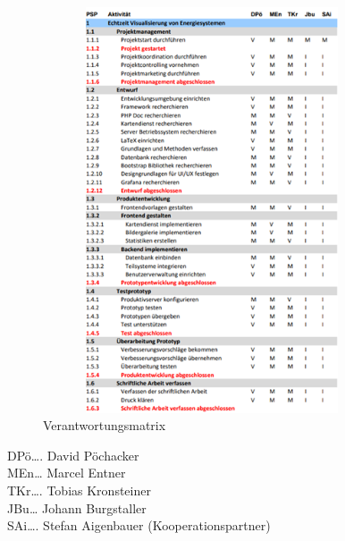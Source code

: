 \begin{figure}[h]
	\centering
	\includegraphics[height=12cm,width=10cm]{images/Verantwortungsmatrix}
	\caption{Verantwortungsmatrix}
	\label{fig:Verantwortungsmatrix }
\end{figure}
 DPö…. David Pöchacker \\
 MEn… Marcel Entner \\
 TKr…. Tobias Kronsteiner \\
 JBu… Johann Burgstaller \\
 SAi…. Stefan Aigenbauer (Kooperationspartner) \\

\newpage
